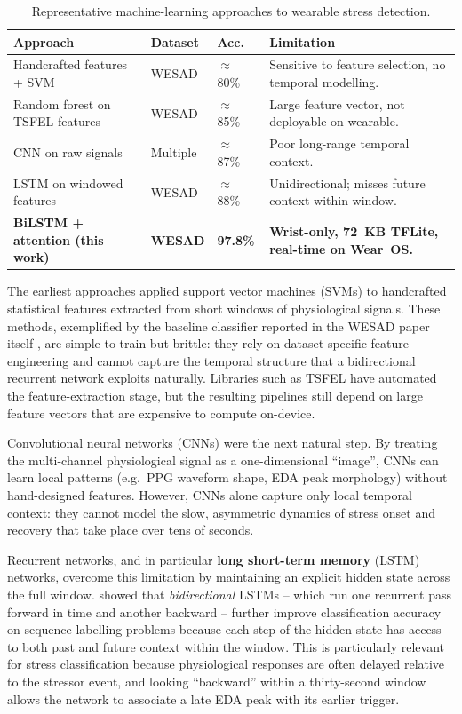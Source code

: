 \begin{table}[H]
\centering
\caption{Representative machine-learning approaches to wearable stress
detection.}
\label{tab:ml-comparison}
\small
\begin{tabular}{p{3.3cm}p{2.3cm}p{1.5cm}p{4.5cm}}
\toprule
\textbf{Approach} & \textbf{Dataset} & \textbf{Acc.} & \textbf{Limitation} \\
\midrule
Handcrafted features + SVM \citep{schmidt2018wesad} & WESAD & $\approx$ 80\% &
Sensitive to feature selection, no temporal modelling. \\
Random forest on TSFEL features \citep{barandas2020tsfel} & WESAD &
$\approx$ 85\% & Large feature vector, not deployable on wearable. \\
CNN on raw signals \citep{can2019stress} & Multiple & $\approx$ 87\% &
Poor long-range temporal context. \\
LSTM on windowed features & WESAD & $\approx$ 88\% & Unidirectional;
misses future context within window. \\
\textbf{BiLSTM + attention (this work)} & \textbf{WESAD} & \textbf{97.8\%}
& \textbf{Wrist-only, 72~KB TFLite, real-time on Wear~OS.} \\
\bottomrule
\end{tabular}
\end{table}

The earliest approaches applied support vector machines (SVMs) to
handcrafted statistical features extracted from short windows of
physiological signals. These methods, exemplified by the baseline
classifier reported in the WESAD paper itself \citep{schmidt2018wesad},
are simple to train but brittle: they rely on dataset-specific
feature engineering and cannot capture the temporal structure that
a bidirectional recurrent network exploits naturally. Libraries such
as TSFEL \citep{barandas2020tsfel} have automated the feature-extraction
stage, but the resulting pipelines still depend on large feature
vectors that are expensive to compute on-device.

Convolutional neural networks (CNNs) were the next natural step.
By treating the multi-channel physiological signal as a one-dimensional
``image'', CNNs can learn local patterns (e.g.\ PPG waveform shape,
EDA peak morphology) without hand-designed features. However, CNNs
alone capture only local temporal context: they cannot model the
slow, asymmetric dynamics of stress onset and recovery that take
place over tens of seconds.

Recurrent networks, and in particular \textbf{long short-term memory}
(LSTM) networks, overcome this limitation by maintaining an explicit
hidden state across the full window. \citet{graves2005bilstm} showed
that \emph{bidirectional} LSTMs -- which run one recurrent pass forward
in time and another backward -- further improve classification accuracy
on sequence-labelling problems because each step of the hidden state
has access to both past and future context within the window. This is
particularly relevant for stress classification because physiological
responses are often delayed relative to the stressor event, and
looking ``backward'' within a thirty-second window allows the network
to associate a late EDA peak with its earlier trigger.

